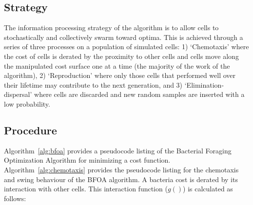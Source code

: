 \subsection{Strategy}
The information processing strategy of the algorithm is to allow cells to stochastically and collectively swarm toward optima.
This is achieved through a series of three processes on a population of simulated cells: 1) `Chemotaxis' where the cost of cells is derated by the proximity to other cells and cells move along the manipulated cost surface one at a time (the majority of the work of the algorithm), 2) `Reproduction' where only those cells that performed well over their lifetime may contribute to the next generation, and 3) `Elimination-dispersal' where cells are discarded and new random samples are inserted with a low probability.

\subsection{Procedure}
Algorithm~\ref{alg:bfoa} provides a pseudocode listing of the Bacterial Foraging Optimization Algorithm for minimizing a cost function. Algorithm~\ref{alg:chemotaxis} provides the pseudocode listing for the chemotaxis and swing behaviour of the BFOA algorithm.
A bacteria cost is derated by its interaction with other cells. This interaction function ($g()$) is calculated as follows: 

